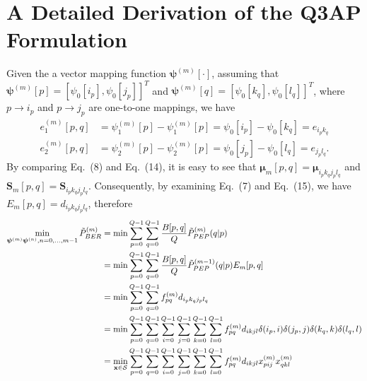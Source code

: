 \documentclass[onecolumn, 11pt, draftclsnofoot]{IEEEtran}
\begin{document}
\section{A Detailed Derivation of the Q3AP Formulation}
Given the a vector mapping function
$\bm{\psi}^{(m)}[\cdot]$, assuming that $\bm{\psi}^{(m)}[p] = [\psi_0[i_p],
\psi_0[j_p]]^T$ and $\bm{\psi}^{(m)}[q] = [\psi_0[k_q], \psi_0[l_q]]^T$,
where $p\rightarrow i_p$ and $p\rightarrow j_p$ are one-to-one mappings, we
have
\begin{subequations}
  \begin{align}
    e_1^{(m)}[p,q] & = \psi_1^{(m)}[p] - \psi_1^{(m)}[p] =\psi_0[i_p] -
    \psi_0[k_q] = e_{i_pk_q} \\
    e_2^{(m)}[p,q] & = \psi_2^{(m)}[p] - \psi_2^{(m)}[p] =\psi_0[j_p] -
    \psi_0[l_q] = e_{j_pl_q}. 
  \end{align}
\end{subequations}
By comparing Eq.~(8) and Eq.~(14), it is easy to see that $\bm{\mu}_m[p,q] =
\bm{\mu}_{i_pk_qj_pl_q}$ and $\mathbf{S}_m[p,q] = \mathbf{S}_{i_pk_qj_pl_q}$.
Consequently, by examining Eq.~(7) and Eq.~(15), we have $E_m[p,q] =
d_{{i_pk_qj_pl_q}}$, therefore
\begin{align}
  \min_{\bm{\psi}^{(m)}\bm{\psi}^{(n)},n=0,\ldots,m-1}\tilde{P}_{BER}^{(m)}
  & = \min \sum_{p=0}^{Q - 1}\sum_{q=0}^{Q - 1}\frac{B[p,
  q]}{Q}\tilde{P}_{PEP}^{(m)}(q|p) \notag \\
  & = \min \sum_{p=0}^{Q - 1}\sum_{q=0}^{Q - 1}\frac{B[p,
  q]}{Q}\tilde{P}_{PEP}^{(m - 1)}(q|p) E_m[p, q] \notag \\
  & = \min \sum_{p=0}^{Q - 1}\sum_{q=0}^{Q - 1} f_{pq}^{(m)} d_{{i_pk_qj_pl_q}}
  \notag \\
  & = \min \sum_{p=0}^{Q - 1} \sum_{q=0}^{Q - 1} \sum_{i=0}^{Q - 1}
  \sum_{j=0}^{Q - 1} \sum_{k=0}^{Q - 1} \sum_{l=0}^{Q - 1}f_{pq}^{(m)}
  d_{ikjl}\delta(i_p,i)\delta(j_p,j)\delta(k_q,k)\delta(l_q,l) \notag
  \\
  &= \min_{\mathbf{x}\in\mathcal{S}} \sum_{p=0}^{Q - 1} \sum_{q=0}^{Q - 1}
  \sum_{i=0}^{Q - 1}
  \sum_{j=0}^{Q - 1} \sum_{k=0}^{Q - 1} \sum_{l=0}^{Q - 1}f_{pq}^{(m)}
  d_{ikjl} x_{pij}^{(m)}x_{qkl}^{(m)}
\end{align}



\end{document}

